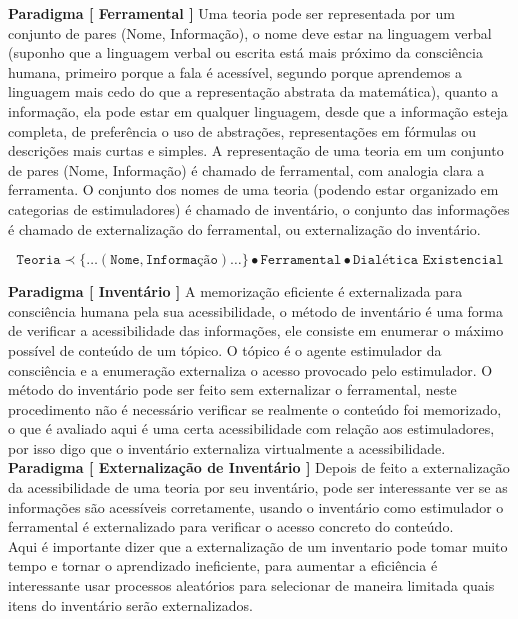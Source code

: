 \documentclass[10pt,a4paper]{report}
\begin{document}
\textbf{Paradigma [ Ferramental ]} Uma teoria pode ser representada por um conjunto de pares (Nome, Informação), o nome deve estar na linguagem verbal (suponho que a linguagem verbal ou escrita está mais próximo da consciência humana, primeiro porque a fala é acessível, segundo porque aprendemos a linguagem mais cedo do que a representação abstrata da matemática), quanto a informação, ela pode estar em qualquer linguagem, desde que a informação esteja completa, de preferência o uso de abstrações, representações em fórmulas ou descrições mais curtas e simples. A representação de uma teoria em um conjunto de pares (Nome, Informação) é chamado de ferramental, com analogia clara a ferramenta. O conjunto dos nomes de uma teoria (podendo estar organizado em categorias de estimuladores) é chamado de inventário, o conjunto das informações é chamado de externalização do ferramental, ou externalização do inventário.

$$ \texttt{Teoria} \prec \{ \dots ( \texttt{Nome} , \texttt{Informação} ) \dots \} \bullet \texttt{Ferramental} \bullet \texttt{Dialética Existencial} $$

\hspace{\baselineskip}

\textbf{Paradigma [ Inventário ]} A memorização eficiente é externalizada para consciência humana pela sua acessibilidade, o método de inventário é uma forma de verificar a acessibilidade das informações, ele consiste em enumerar o máximo possível de conteúdo de um tópico. O tópico é o agente estimulador da consciência e a enumeração externaliza o acesso provocado pelo estimulador. O método do inventário pode ser feito sem externalizar o ferramental, neste procedimento não é necessário verificar se realmente o conteúdo foi memorizado, o que é avaliado aqui é uma certa acessibilidade com relação aos estimuladores, por isso digo que o inventário externaliza virtualmente a acessibilidade. \\

\textbf{Paradigma [ Externalização de Inventário ]} Depois de feito a externalização da acessibilidade de uma teoria por seu inventário, pode ser interessante ver se as informações são acessíveis corretamente, usando o inventário como estimulador o ferramental é externalizado para verificar o acesso concreto do conteúdo.\\

Aqui é importante dizer que a externalização de um inventario pode tomar muito tempo e tornar o aprendizado ineficiente, para aumentar a eficiência é interessante usar processos aleatórios para selecionar de maneira limitada quais itens do inventário serão externalizados.\\
\end{document}
